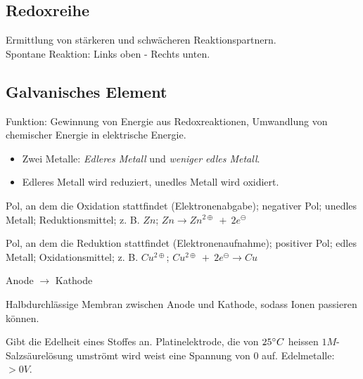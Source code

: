 \subsection{Redoxreihe}

Ermittlung von stärkeren und schwächeren Reaktionspartnern.\\

Spontane Reaktion: Links oben - Rechts unten.

\subsection{Galvanisches Element}

Funktion: Gewinnung von Energie aus Redoxreaktionen, Umwandlung von chemischer Energie in elektrische Energie.

\begin{itemize}
	\item Zwei Metalle: \textit{Edleres Metall} und \textit{weniger edles Metall}.
	\item Edleres Metall wird reduziert, unedles Metall wird oxidiert.
\end{itemize}

\begin{definition}[Anode]
	Pol, an dem die Oxidation stattfindet (Elektronenabgabe); negativer Pol; unedles Metall; Reduktionsmittel; z. B. $Zn$; $Zn \rightarrow Zn^{2\oplus}\ +\ 2e^\ominus$
\end{definition}

\begin{definition}[Kathode]
	Pol, an dem die Reduktion stattfindet (Elektronenaufnahme); positiver Pol; edles Metall; Oxidationsmittel; z. B. $Cu^{2\oplus}$; $Cu^{2\oplus}\ + \ 2e^\ominus \rightarrow Cu$
\end{definition}

\begin{definition}[Stromfluss]
	Anode $\rightarrow$ Kathode
\end{definition}

\begin{definition}[Membran]
	Halbdurchlässige Membran zwischen Anode und Kathode, sodass Ionen passieren können.
\end{definition}

\begin{definition}[Standardreduktionspotential]
	Gibt die Edelheit eines Stoffes an. Platinelektrode, die von $25\degree C$ heissen $1M$-Salzsäurelösung umströmt wird weist eine Spannung von $0$ auf.
	Edelmetalle: $>0V$.
\end{definition}

